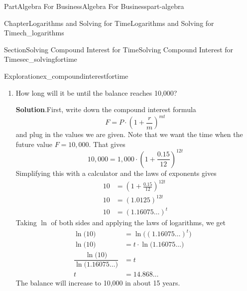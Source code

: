 \documentclass{tufte-book}
\newcommand{\blocktitlefont}{\relax}
\numberwithin{equation}{chapter}
\newcommand{\amp}{&}
\begin{document}
\begin{partptx}{Part}{Algebra For Business}{}{Algebra For Business}{}{}{part-algebra}
\begin{chapterptx}{Chapter}{Logarithms and Solving for Time}{}{Logarithms and Solving for Time}{}{}{ch_logarithms}
\begin{sectionptx}{Section}{Solving Compound Interest for Time}{}{Solving Compound Interest for Time}{}{}{sec_solvingfortime}
\begin{exploration}{Exploration}{}{ex_compoundinterestfortime}
\begin{enumerate}[font=\bfseries,label=(\alph*),ref=\alph*]
\begin{align*}
2 = \amp \left(\ 1.16075\dots\ \right)^{t} \amp 
\end{align*}
%
\par
Finally, finish solving the exponential equation as above using the  \hyperref[assemblage-lawsoflogs]{Laws of Logs}.%
\begin{align*}
\ln\Big(2\Big) = \amp \ln\Big( \left(\ 1.16075\dots\ \right)^{t} \Big) \amp \\
\ln\Big(2\Big) = \amp t\cdot \ln\Big(  1.16075\dots \Big) \amp \qquad\text{Using }\ln(a^r) = r\ln(a)\\
t = \amp \dfrac{ \ln\Big(2\Big)}{\ln\Big(  1.16075\dots \Big) }\amp \qquad\text{Dividing both sides by }\ln\Big(  1.16075\dots \Big)\\
t = \amp 4.64\dots
\end{align*}
With 15\% interest, it will take about 4.64 years for the balance to double.%
\item{}How long will it be until the balance reaches \textdollar{}10,000?%
\par\smallskip%
\noindent\textbf{\blocktitlefont Solution}.\hypertarget{ex_compoundinterestfortime-3-2}{}\quad{}First, write down the compound interest formula%
\begin{equation*}
F = P\cdot \left(1 + \frac{r}{m}\right)^{mt}
\end{equation*}
and plug in the values we are given.  Note that we want the time when the future value \(F=10,000\).  That gives%
\begin{equation*}
10,000 = 1,000 \cdot (1 + \frac{0.15}{12})^{12t}
\end{equation*}
Simplifying this with a calculator and the laws of exponents gives%
\begin{align*}
10 \amp = (1 + \frac{0.15}{12})^{12t}\\
10 \amp = (1.0125 )^{12t}\\
10 \amp = (1.16075\dots )^{t}
\end{align*}
Taking \(\ln\) of both sides and applying the laws of logarithms, we get%
\begin{align*}
\ln\Big(10\Big) \amp = \ln\Big( (1.16075\dots )^{t} \Big)\\
\ln\Big(10\Big) \amp = t\cdot \ln\Big( 1.16075\dots  \Big)\\
\dfrac{\ln\Big(10\Big)}{\ln\Big( 1.16075\dots  \Big)} \amp = t  \\
t \amp = 14.868\dots \amp 
\end{align*}
The balance will increase to \textdollar{}10,000 in about 15 years.%

\end{enumerate}
\end{exploration}
\end{sectionptx}
\end{chapterptx}
\end{partptx}
\end{document}
